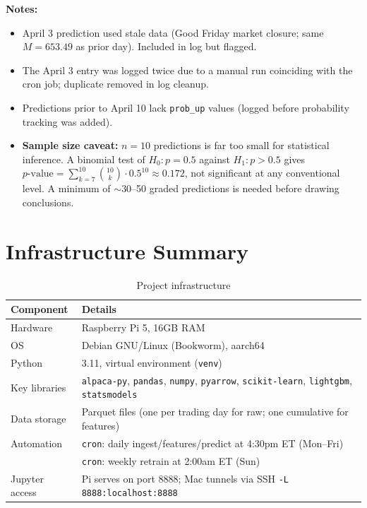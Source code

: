 \documentclass[11pt]{article}
\begin{document}
\textbf{Notes:}
\begin{itemize}
    \item April 3 prediction used stale data (Good Friday market closure; same $M = 653.49$ as prior day). Included in log but flagged.
    \item The April 3 entry was logged twice due to a manual run coinciding with the cron job; duplicate removed in log cleanup.
    \item Predictions prior to April 10 lack \texttt{prob\_up} values (logged before probability tracking was added).
    \item \textbf{Sample size caveat:} $n = 10$ predictions is far too small for statistical inference. A binomial test of $H_0: p = 0.5$ against $H_1: p > 0.5$ gives $p\text{-value} = \sum_{k=7}^{10} \binom{10}{k} \cdot 0.5^{10} \approx 0.172$, not significant at any conventional level. A minimum of $\sim$30--50 graded predictions is needed before drawing conclusions.
\end{itemize}

\section{Infrastructure Summary}

\begin{table}[htbp]
\centering
\caption{Project infrastructure}
\begin{tabular}{ll}
\toprule
Component & Details \\
\midrule
Hardware        & Raspberry Pi 5, 16GB RAM \\
OS              & Debian GNU/Linux (Bookworm), aarch64 \\
Python          & 3.11, virtual environment (\texttt{venv}) \\
Key libraries   & \texttt{alpaca-py}, \texttt{pandas}, \texttt{numpy}, \texttt{pyarrow}, \texttt{scikit-learn}, \texttt{lightgbm}, \texttt{statsmodels} \\
Data storage    & Parquet files (one per trading day for raw; one cumulative for features) \\
Automation      & \texttt{cron}: daily ingest/features/predict at 4:30pm ET (Mon--Fri) \\
                & \texttt{cron}: weekly retrain at 2:00am ET (Sun) \\
Jupyter access  & Pi serves on port 8888; Mac tunnels via SSH \texttt{-L 8888:localhost:8888} \\
\bottomrule
\end{tabular}
\end{table}
\end{document}
